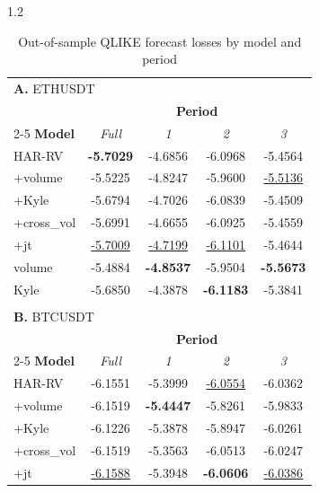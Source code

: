 \documentclass[10pt]{article}
\begin{document}
\begin{setstretch}{1.2}
\begin{table}
\centering
\small
\caption{Out-of-sample QLIKE forecast losses by model and period}
\vspace{4pt}
\label{tab:forecast}
\renewcommand{\arraystretch}{1.3}
\setlength{\tabcolsep}{10pt}
\begin{tabular}{lcccc}
\multicolumn{5}{l}{\textbf{A.} ETHUSDT} \\
& \multicolumn{4}{c}{\textbf{Period}} \\
\cline{2-5}
\textbf{Model} & \textit{Full}    & \textit{1}          & \textit{2}          & \textit{3} \\
\hline
HAR-RV      & \textbf{-5.7029}    & -4.6856             & -6.0968             & -5.4564 \\
+volume     & -5.5225             & -4.8247             & -5.9600             & \underline{-5.5136} \\
+Kyle       & -5.6794             & -4.7026             & -6.0839             & -5.4509 \\
+cross\_vol & -5.6991             & -4.6655             & -6.0925             & -5.4559 \\
+jt         & \underline{-5.7009} & \underline{-4.7199} & \underline{-6.1101} & -5.4644 \\
volume      & -5.4884             & \textbf{-4.8537}    & -5.9504             & \textbf{-5.5673} \\
Kyle        & -5.6850             & -4.3878             & \textbf{-6.1183}    & -5.3841 \\
\hline
\\[2pt]
\multicolumn{5}{l}{\textbf{B.} BTCUSDT} \\
& \multicolumn{4}{c}{\textbf{Period}} \\
\cline{2-5}
\textbf{Model} & \textit{Full}    & \textit{1}          & \textit{2}          & \textit{3} \\
\hline
HAR-RV      & -6.1551             & -5.3999             & \underline{-6.0554} & -6.0362 \\
+volume     & -6.1519             & \textbf{-5.4447}    & -5.8261             & -5.9833 \\
+Kyle       & -6.1226             & -5.3878             & -5.8947             & -6.0261 \\
+cross\_vol & -6.1519             & -5.3563             & -6.0513             & -6.0247 \\
+jt         & \underline{-6.1588} & -5.3948             & \textbf{-6.0606}    & \underline{-6.0386} \\

\end{tabular}
\end{table}
\end{setstretch}
\end{document}
